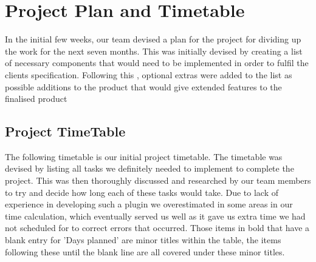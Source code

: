 \documentclass{l3proj}
\begin{document}
\section{Project Plan and Timetable}
In the initial few weeks, our team devised a plan for the project for dividing up the work for the next seven months. This was initially devised by creating a list of necessary components that would need to be implemented in order to fulfil the clients specification. Following this , optional extras were added to the list as possible additions to the product that would give extended features to the finalised product

\subsection{Project TimeTable}
The following timetable is our initial project timetable. The timetable was devised by listing all tasks we definitely needed to implement to complete the project. This was then thoroughly discussed and researched by our team members to try and decide how long each of these tasks would take. Due to lack of experience in developing such a plugin we overestimated in some areas in our time calculation, which eventually served us well as it gave us extra time we had not scheduled for to correct errors that occurred. Those items in bold that have a blank entry for 'Days planned' are minor titles within the table, the items following these until the blank line are all covered under these minor titles. 
\end{document}
